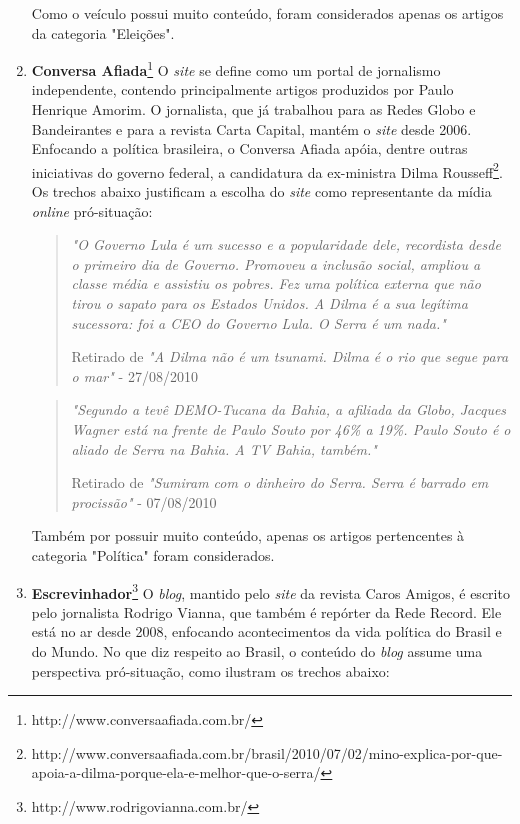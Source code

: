 \begin{enumerate}
Como o veículo possui muito conteúdo, foram considerados apenas os artigos da categoria "Eleições".  

\item \textbf{Conversa Afiada}\footnote{http://www.conversaafiada.com.br/} O \emph{site} se define como um portal de jornalismo independente, contendo principalmente artigos produzidos por Paulo Henrique Amorim. O jornalista, que já trabalhou para as Redes Globo e Bandeirantes e para a revista Carta Capital, mantém o \emph{site} desde 2006. Enfocando a política brasileira, o Conversa Afiada apóia, dentre outras iniciativas do governo federal, a candidatura da ex-ministra Dilma Rousseff\footnote{http://www.conversaafiada.com.br/brasil/2010/07/02/mino-explica-por-que-apoia-a-dilma-porque-ela-e-melhor-que-o-serra/}. Os trechos abaixo justificam a escolha do \emph{site} como representante da mídia \emph{online} pró-situação:

\begin{quote}

\emph{"O Governo Lula é um sucesso e a popularidade dele, recordista desde o primeiro dia de Governo. Promoveu a inclusão social, ampliou a classe média e assistiu os pobres. Fez uma política externa que não tirou o sapato para os Estados Unidos. A Dilma é a sua legítima sucessora: foi a CEO do Governo Lula. O Serra é um nada."}

{\small Retirado de \emph{"A Dilma não é um tsunami. Dilma é o rio que segue para o mar"} - 27/08/2010}
\end{quote}

\begin{quote}

\emph{"Segundo a tevê DEMO-Tucana da Bahia, a afiliada da Globo, Jacques Wagner está na frente de Paulo Souto por 46\% a 19\%. Paulo Souto é o aliado de Serra na Bahia. A TV Bahia, também."}

{\small Retirado de \emph{"Sumiram com o dinheiro do Serra. Serra é barrado em procissão"} - 07/08/2010}
\end{quote}


Também por possuir muito conteúdo, apenas os artigos pertencentes à categoria "Política" foram considerados.

\item \textbf{Escrevinhador}\footnote{http://www.rodrigovianna.com.br/} O \emph{blog}, mantido pelo \emph{site} da revista Caros Amigos, é escrito pelo jornalista Rodrigo Vianna, que também é repórter da Rede Record. Ele está no ar desde 2008, enfocando acontecimentos da vida política do Brasil e do Mundo. No que diz respeito ao Brasil, o conteúdo do \emph{blog} assume uma perspectiva pró-situação, como ilustram os trechos abaixo:


\end{enumerate}
